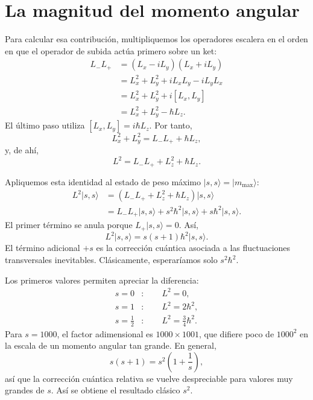 \section{La magnitud del momento angular}

\begin{classroomqa}
\end{classroomqa}

Para calcular esa contribución, multipliquemos los operadores escalera en el orden en que el operador de subida actúa primero sobre un ket:
\begin{align}
L_-L_+
&=(L_x-iL_y)(L_x+iL_y) \\
&=L_x^2+L_y^2+iL_xL_y-iL_yL_x \\
&=L_x^2+L_y^2+i[L_x,L_y] \\
&=L_x^2+L_y^2-\hbar L_z.
\end{align}
El último paso utiliza \([L_x,L_y]=i\hbar L_z\). Por tanto,
\begin{equation}
L_x^2+L_y^2=L_-L_++\hbar L_z,
\end{equation}
y, de ahí,
\begin{equation}
L^2=L_-L_++L_z^2+\hbar L_z.
\end{equation}

Apliquemos esta identidad al estado de peso máximo \(\lvert s,s\rangle=\lvert m_{\max}\rangle\):
\begin{align}
L^2\lvert s,s\rangle
&=\left(L_-L_++L_z^2+\hbar L_z\right)\lvert s,s\rangle \\
&=L_-L_+\lvert s,s\rangle
+s^2\hbar^2\lvert s,s\rangle
+s\hbar^2\lvert s,s\rangle.
\end{align}
El primer término se anula porque \(L_+\lvert s,s\rangle=0\). Así,
\begin{equation}
L^2\lvert s,s\rangle
=s(s+1)\hbar^2\lvert s,s\rangle.
\end{equation}
El término adicional \(+s\) es la corrección cuántica asociada a las fluctuaciones transversales inevitables. Clásicamente, esperaríamos solo \(s^2\hbar^2\).

Los primeros valores permiten apreciar la diferencia:
\begin{align}
s=0 &: \qquad L^2=0,\\
s=1 &: \qquad L^2=2\hbar^2,\\
s=\frac12 &: \qquad L^2=\frac34\hbar^2.
\end{align}
Para \(s=1000\), el factor adimensional es \(1000\times1001\), que difiere poco de \(1000^2\) en la escala de un momento angular tan grande. En general,
\begin{equation}
s(s+1)=s^2\left(1+\frac1s\right),
\end{equation}
así que la corrección cuántica relativa se vuelve despreciable para valores muy grandes de \(s\). Así se obtiene el resultado clásico \(s^2\).

